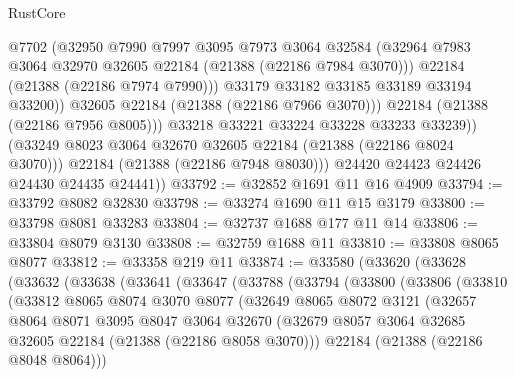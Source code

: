 \begin{lexlean}{RustCore}
\begin{coremodule}
                      @7702
                      (@32950
                        @7990
                        @7997
                        @3095
                        @7973
                        @3064
                        @32584
                        (@32964 @7983 @3064 @32970 @32605 @22184 (@21388 (@22186 @7984 @3070)))
                        @22184
                        (@21388 (@22186 @7974 @7990)))
                      @33179
                      @33182
                      @33185
                      @33189
                      @33194
                      @33200))
                  @32605
                  @22184
                  (@21388 (@22186 @7966 @3070)))
                @22184
                (@21388 (@22186 @7956 @8005)))
              @33218
              @33221
              @33224
              @33228
              @33233
              @33239))
          (@33249 @8023 @3064 @32670 @32605 @22184 (@21388 (@22186 @8024 @3070)))
          @22184
          (@21388 (@22186 @7948 @8030)))
        @24420
        @24423
        @24426
        @24430
        @24435
        @24441))
@33792 := @32852 @1691 @11 @16 @4909
@33794 := @33792 @8082 @32830
@33798 := @33274 @1690 @11 @15 @3179
@33800 := @33798 @8081 @33283
@33804 := @32737 @1688 @177 @11 @14
@33806 := @33804 @8079 @3130
@33808 := @32759 @1688 @11
@33810 := @33808 @8065 @8077
@33812 := @33358 @219 @11
@33874 := @33580
    (@33620
      (@33628
        (@33632
          (@33638
            (@33641
              (@33647
                (@33788
                  (@33794
                    (@33800
                      (@33806
                        (@33810
                          (@33812
                            @8065
                            @8074
                            @3070
                            @8077
                            (@32649
                              @8065
                              @8072
                              @3121
                              (@32657
                                @8064
                                @8071
                                @3095
                                @8047
                                @3064
                                @32670
                                (@32679
                                  @8057
                                  @3064
                                  @32685
                                  @32605
                                  @22184
                                  (@21388 (@22186 @8058 @3070)))
                                @22184
                                (@21388 (@22186 @8048 @8064)))

\end{coremodule}
\end{lexlean}
